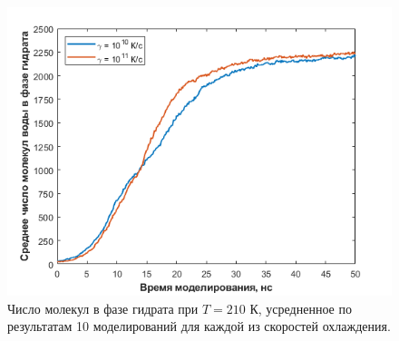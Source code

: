 \begin{figure}[H]
    \centering
    \includegraphics[width=.9\linewidth]{figures/bulk.png}
    \caption{Число молекул в фазе гидрата при $T=210$ К, усредненное по результатам 10 моделирований для каждой из скоростей охлаждения.}
    \label{fig3.8}
\end{figure}
\pagebreak

